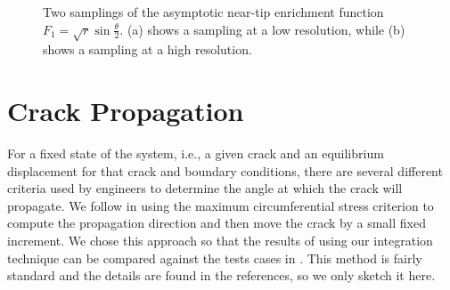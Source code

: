 \setlength{\figurewidth}{0.50\textwidth}
\begin{figure}[htbp]
\centering
{}
\caption{Two samplings of the asymptotic near-tip enrichment function $F_1 = \sqrt{r} \sin \frac{\theta}{2}$. (a) shows a sampling at a low resolution, while (b) shows a sampling at a high resolution.}
\label{fig:chap1.sampling}
\end{figure}

\section{Crack Propagation} \label{sec:chap1.propagation}

For a fixed state of the system, i.e., a given crack and an equilibrium displacement for that crack and boundary conditions, there are several different criteria used by engineers to determine the angle at which the crack will propagate. We follow \cite{Moes99} in using the maximum circumferential stress criterion to compute the propagation direction and then move the crack by a small fixed increment. We chose this approach so that the results of using our integration technique can be compared against the tests cases in \cite{Moes99}. This method is fairly standard and the details are found in the references, so we only sketch it here.

